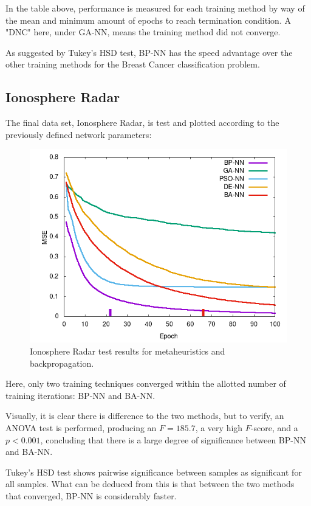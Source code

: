 \documentclass[a4paper,12pt]{article}
\begin{document}
In the table above, performance is measured for each training method by way of the mean and minimum amount of epochs to reach termination condition. A "DNC" here, under GA-NN, means the training method did not converge.

As suggested by Tukey's HSD test, BP-NN has the speed advantage over the other training methods for the Breast Cancer classification problem.

\pagebreak

\subsection{Ionosphere Radar}

The final data set, Ionosphere Radar, is test and plotted according to the previously defined network parameters:

\begin{figure}[h!]
\centering
\includegraphics[scale=0.65]{images/ionosphere-plot.png}
\caption{Ionosphere Radar test results for metaheuristics and backpropagation.}
\label{fig:ionosphere}
\end{figure}

Here, only two training techniques converged within the allotted number of training iterations: BP-NN and BA-NN. 

Visually, it is clear there is difference to the two methods, but to verify, an ANOVA test is performed, producing an $F = 185.7$, a very high $F$-score, and a $p < 0.001$, concluding that there is a large degree of significance between BP-NN and BA-NN.

Tukey's HSD test shows pairwise significance between samples as significant for all samples. What can be deduced from this is that between the two methods that converged, BP-NN is considerably faster.
\end{document}
